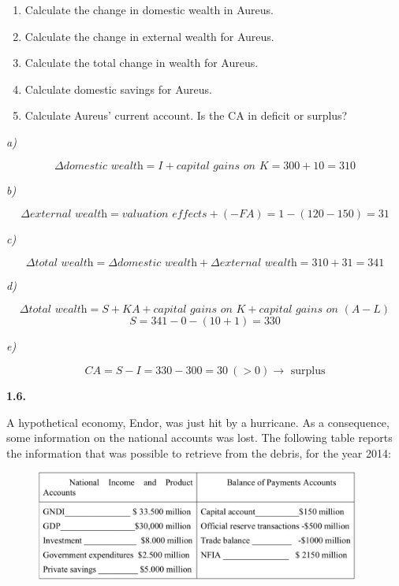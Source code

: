\documentclass[11pt, a4paper]{article}
\begin{document}
\begin{enumerate}[label=\emph{\alph*}), topsep = \lineskip, itemsep = \lineskip, partopsep = \lineskip, parsep = \lineskip]
	\item Calculate the change in domestic wealth in Aureus.
  \item Calculate the change in external wealth for Aureus.
  \item Calculate the total change in wealth for Aureus.
  \item Calculate domestic savings for Aureus.
  \item Calculate Aureus’ current account. Is the CA in deficit or surplus?
\end{enumerate}

\dotfill

\textit{a)}

$$\Delta \textit{domestic wealth} = I + \textit{capital gains on K} =  300 + 10 = 310$$

\textit{b)}

$$\Delta \textit{external wealth} =\textit{valuation effects} + (-FA) =  1 - (120-150) = 31$$

\textit{c)}

$$\Delta \textit{total wealth} =\Delta \textit{domestic wealth} + \Delta \textit{external wealth} =  310 + 31 = 341$$

\textit{d)}

$$\Delta \textit{total wealth} = S + KA + \textit{capital gains on K} + \textit{capital gains on $(A-L)$} $$
$$ S = 341 - 0 - (10 + 1) =  330$$

\textit{e)}

$$ CA = S - I = 330 - 300 = 30 \ (>0) \rightarrow \text{ surplus}$$

\clearpage

\textbf{1.6.}

A hypothetical economy, Endor, was just hit by a hurricane. As a consequence, some information on the national accounts was lost. The following table reports the information that was possible to retrieve from the debris, for the year 2014:

\begin{figure}[!htb]
	\centering
	\includegraphics[width=0.95\textwidth]{img/ps01_0106.png}
\end{figure}
\end{document}
